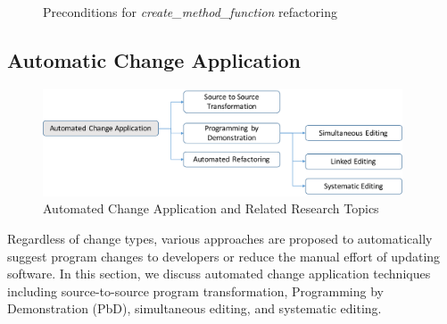 \documentclass[runningheads,a4paper]{llncs}
\begin{document}
\begin{figure}[!htb]
\centering
{}
\caption{Preconditions for \emph{create\_method\_function} refactoring~\cite{Opdyke1992:ROF}}
\label{fig:preconditions}
\end{figure}
\subsection{Automatic Change Application}
\label{sec:automatic}


\begin{figure}[ht]
 \centering
 \includegraphics[width=0.95\textwidth]{images/AutomatedChange.pdf}
 \caption{Automated Change Application and Related Research Topics} 
 \label{fig:automaticapplication} 
\end{figure}



Regardless of change types, various approaches are proposed to automatically suggest program changes to developers or reduce the manual effort of updating software. In this section, we discuss automated change application techniques including source-to-source program transformation, Programming by Demonstration (PbD), simultaneous editing, and systematic editing.
\end{document}
